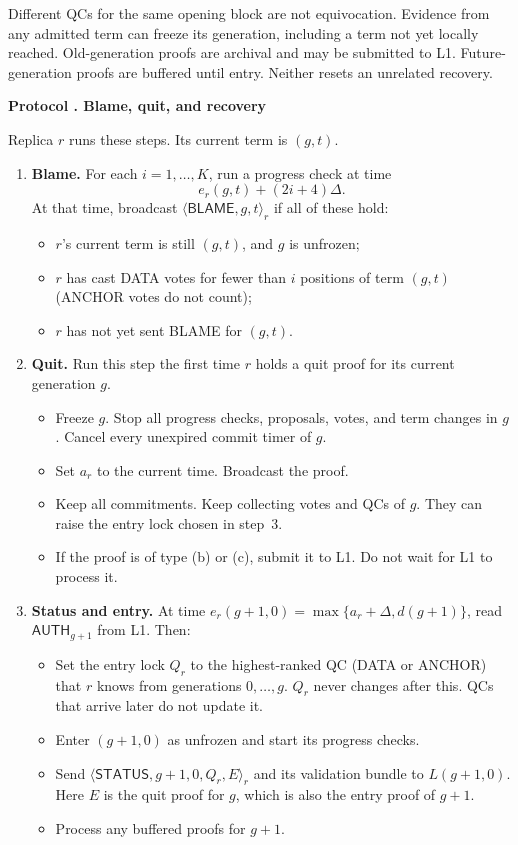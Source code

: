 \documentclass[11pt,a4paper]{article}
\newcommand{\RR}[1]{{\color{rrRed}#1}}
\newcommand{\tagg}[1]{\ensuremath{\mathsf{#1}}}
\newcounter{protocol}
\newenvironment{protocol}[2]{\refstepcounter{protocol}\label{#1}
\begin{mdframed}[nobreak=true,linewidth=.6pt,skipabove=8pt,skipbelow=8pt,
innertopmargin=7pt,innerbottommargin=7pt]\small
\textbf{Protocol \theprotocol. #2}\par\smallskip}{\end{mdframed}}
\begin{document}
Different QCs for the same opening block are not equivocation. Evidence
from any admitted term can freeze its generation, including a term not yet
locally reached. Old-generation proofs are archival and may be submitted to
L1. Future-generation proofs are buffered until entry. Neither resets an
unrelated recovery.

\begin{protocol}{alg:recovery}{Blame, quit, and recovery}
Replica $r$ runs these steps. Its current term is $(g,t)$.
\begin{enumerate}[label=\textbf{\arabic*)},itemsep=5pt]
\item \textbf{Blame.} For each $i=1,\ldots,K$, run a progress check at
time
\[
 e_r(g,t)+(2i+4)\Delta.
\]
At that time, broadcast $\langle\tagg{BLAME},g,t\rangle_r$ if all of these
hold:
 \begin{itemize}
 \item $r$'s current term is still $(g,t)$, and $g$ is unfrozen;
 \item $r$ has cast DATA votes for fewer than $i$ positions of term
       $(g,t)$ \RR{(ANCHOR votes do not count)};
 \item $r$ has not yet sent BLAME for $(g,t)$.
 \end{itemize}

\item \textbf{Quit.} Run this step the first time $r$ holds a quit proof
for its current generation $g$.
 \begin{itemize}
 \item \RR{Freeze $g$. Stop all progress checks, proposals, votes, and
       term changes in $g$. Cancel every unexpired commit timer of $g$.}
 \item Set $a_r$ to the current time. Broadcast the proof.
 \item Keep all commitments. Keep collecting votes and QCs of $g$.
       They can raise the entry lock chosen in step~3.
 \item \RR{If the proof is of type (b) or (c), submit it to L1. Do
       not wait for L1 to process it.}
 \end{itemize}

\item \textbf{Status and entry.} \RR{At time
$e_r(g+1,0)=\max\{a_r+\Delta,d(g+1)\}$, read $\tagg{AUTH}_{g+1}$ from L1.}
Then:
 \begin{itemize}
 \item Set the entry lock $Q_r$ to the highest-ranked QC
       (DATA or ANCHOR) that $r$ knows from generations
       $0,\ldots,g$.
       $Q_r$ never changes after this. QCs that arrive later do not update
       it.
 \item Enter $(g+1,0)$ \RR{as unfrozen and start its progress checks}.
 \item Send $\langle\tagg{STATUS},g+1,0,Q_r,E\rangle_r$ and its validation
       bundle to \RR{$L(g+1,0)$}. Here $E$ is the quit proof for $g$,
       which is also the entry proof of $g+1$.
 \item \RR{Process any buffered proofs for $g+1$.}
 \end{itemize}


\end{enumerate}
\end{protocol}
\end{document}
